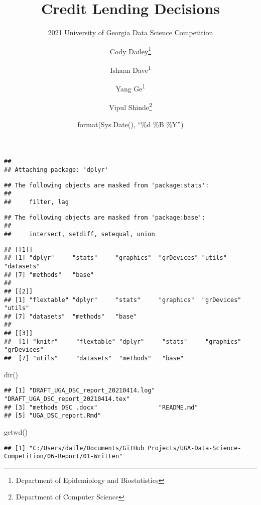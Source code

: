 \documentclass[
]{article}
\title{Credit Lending Decisions}
\subtitle{2021 University of Georgia Data Science Competition}
\author{Cody Dailey\footnote{Department of Epidemiology and Biostatistics} \and Ishaan Dave\textsuperscript{1} \and Yang Ge\textsuperscript{1} \and Vipul Shinde\footnote{Department of Computer Science}}
\date{format(Sys.Date(), ``\%d \%B \%Y'')}
\newenvironment{Shaded}{\begin{snugshade}}{\end{snugshade}}
\newcommand{\FunctionTok}[1]{\textcolor[rgb]{0.00,0.00,0.00}{#1}}
\newcommand{\NormalTok}[1]{#1}
\begin{document}
\maketitle

{
\setcounter{tocdepth}{2}
\tableofcontents
}
\begin{verbatim}
## 
## Attaching package: 'dplyr'
\end{verbatim}

\begin{verbatim}
## The following objects are masked from 'package:stats':
## 
##     filter, lag
\end{verbatim}

\begin{verbatim}
## The following objects are masked from 'package:base':
## 
##     intersect, setdiff, setequal, union
\end{verbatim}

\begin{verbatim}
## [[1]]
## [1] "dplyr"     "stats"     "graphics"  "grDevices" "utils"     "datasets" 
## [7] "methods"   "base"     
## 
## [[2]]
## [1] "flextable" "dplyr"     "stats"     "graphics"  "grDevices" "utils"    
## [7] "datasets"  "methods"   "base"     
## 
## [[3]]
##  [1] "knitr"     "flextable" "dplyr"     "stats"     "graphics"  "grDevices"
##  [7] "utils"     "datasets"  "methods"   "base"
\end{verbatim}

\begin{Shaded}
\begin{Highlighting}[]
\FunctionTok{dir}\NormalTok{()}
\end{Highlighting}
\end{Shaded}

\begin{verbatim}
## [1] "DRAFT_UGA_DSC_report_20210414.log" "DRAFT_UGA_DSC_report_20210414.tex"
## [3] "methods DSC .docx"                 "README.md"                        
## [5] "UGA_DSC_report.Rmd"
\end{verbatim}

\begin{Shaded}
\begin{Highlighting}[]
\FunctionTok{getwd}\NormalTok{()}
\end{Highlighting}
\end{Shaded}

\begin{verbatim}
## [1] "C:/Users/daile/Documents/GitHub Projects/UGA-Data-Science-Competition/06-Report/01-Written"
\end{verbatim}
\end{document}

